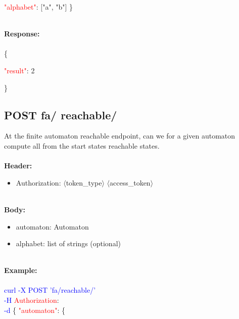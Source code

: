    \begin{adjustwidth}{7.5 mm}{0 cm}
    \textcolor{red}{"alphabet"}: ["a", "b"] \}
    \end{adjustwidth}
\ \\
\textbf{Response:}\\
\ \\
\{
\begin{adjustwidth}{7.5 mm}{0 cm}
    \textcolor{red}{"result"}: 2
\end{adjustwidth}
\}





\subsection{POST fa/ reachable/}
At the finite automaton reachable endpoint, can we for a given automaton compute all from the start states reachable states. \\
\ \\
\textbf{Header:}
\begin{itemize}
    \item Authorization: $\langle$token\_type$\rangle$ $\langle$access\_token$\rangle$
\end{itemize}
\ \\
\textbf{Body:}
\begin{itemize}
    \item automaton: Automaton
    \item alphabet: list of strings (optional)
\end{itemize}
\ \\
\textbf{Example:} \\
\ \\
\textcolor{blue}{curl -X POST '\BaseURL fa/reachable/'\\
-H} \textcolor{red}{Authorization}: \Auth \\
\textcolor{blue}{-d} \{ 
     \textcolor{red}{"automaton"}: \{
